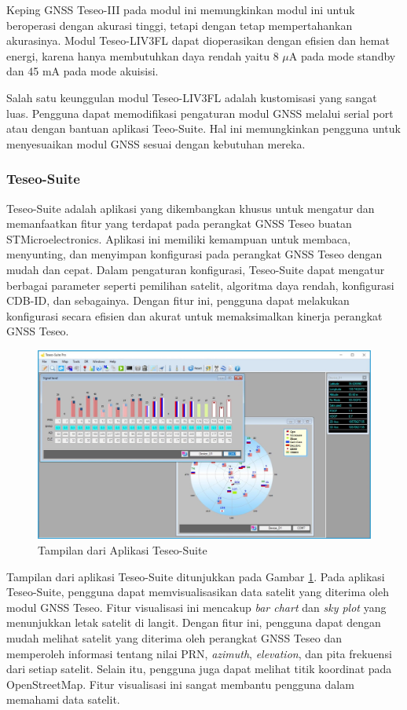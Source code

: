 Keping GNSS Teseo-III pada modul ini memungkinkan modul ini untuk beroperasi dengan akurasi tinggi, tetapi dengan tetap mempertahankan akurasinya. Modul Teseo-LIV3FL dapat dioperasikan dengan efisien dan hemat energi, karena hanya membutuhkan daya rendah yaitu 8 $\mu$A pada mode standby dan 45 mA pada mode akuisisi.

Salah satu keunggulan modul Teseo-LIV3FL adalah kustomisasi yang sangat luas. Pengguna dapat memodifikasi pengaturan modul GNSS melalui serial port atau dengan bantuan aplikasi Teeo-Suite. Hal ini memungkinkan pengguna untuk menyesuaikan modul GNSS sesuai dengan kebutuhan mereka.

\subsubsection{Teseo-Suite}
Teseo-Suite adalah aplikasi yang dikembangkan khusus untuk mengatur dan memanfaatkan fitur yang terdapat pada perangkat GNSS Teseo buatan STMicroelectronics. Aplikasi ini memiliki kemampuan untuk membaca, menyunting, dan menyimpan konfigurasi pada perangkat GNSS Teseo dengan mudah dan cepat. Dalam pengaturan konfigurasi, Teseo-Suite dapat mengatur berbagai parameter seperti pemilihan satelit, algoritma daya rendah, konfigurasi CDB-ID, dan sebagainya. Dengan fitur ini, pengguna dapat melakukan konfigurasi secara efisien dan akurat untuk memaksimalkan kinerja perangkat GNSS Teseo.

\begin{figure}[H]
	\centering
	\includegraphics[width=13cm]{contents/chapter-2/teseo-suite.jpeg}
	\caption{Tampilan dari Aplikasi Teseo-Suite}
	\label{Fig: teseo-suite-ss}
\end{figure}

Tampilan dari aplikasi Teseo-Suite ditunjukkan pada Gambar \ref{Fig: teseo-suite-ss}. Pada aplikasi Teseo-Suite, pengguna dapat memvisualisasikan data satelit yang diterima oleh modul GNSS Teseo. Fitur visualisasi ini mencakup \textit{bar chart} dan \textit{sky plot} yang menunjukkan letak satelit di langit. Dengan fitur ini, pengguna dapat dengan mudah melihat satelit yang diterima oleh perangkat GNSS Teseo dan memperoleh informasi tentang nilai PRN, \textit{azimuth}, \textit{elevation}, dan pita frekuensi dari setiap satelit. Selain itu, pengguna juga dapat melihat titik koordinat pada OpenStreetMap. Fitur visualisasi ini sangat membantu pengguna dalam memahami data satelit.

